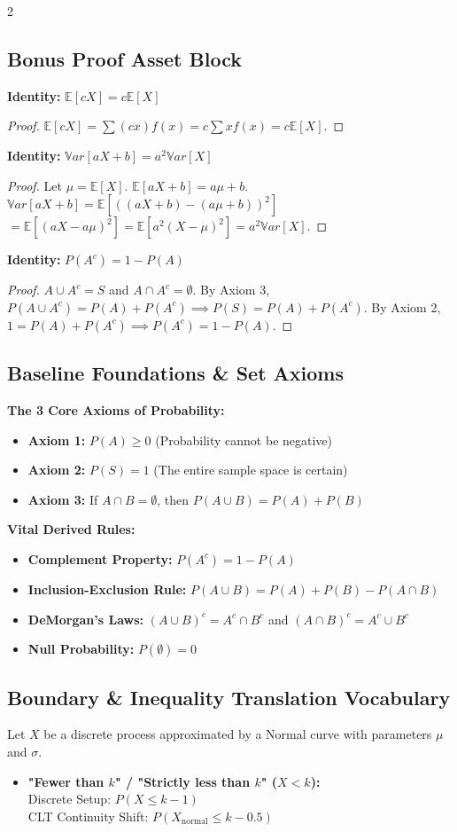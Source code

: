 \documentclass[9pt,landscape]{article}
\newcommand{\Var}{\mathbb{V}ar}
\newcommand{\E}{\mathbb{E}}
\begin{document}
\begin{multicols*}{2}
\subsection*{Bonus Proof Asset Block}
\textbf{Identity: } $\E[cX] = c\E[X]$
\begin{proof}
$\E[cX] = \sum (cx)f(x) = c\sum xf(x) = c\E[X].$
\end{proof}

\textbf{Identity: } $\Var[aX + b] = a^2\Var[X]$
\begin{proof}
Let $\mu = \E[X]$. $\E[aX+b] = a\mu+b$. \\
$\Var[aX+b] = \E[((aX+b) - (a\mu+b))^2]$ \\
$= \E[(aX - a\mu)^2] = \E[a^2(X-\mu)^2] = a^2\Var[X].$
\end{proof}

\textbf{Identity: } $P(A^c) = 1 - P(A)$
\begin{proof}
$A \cup A^c = S$ and $A \cap A^c = \emptyset$. By Axiom 3, $P(A \cup A^c) = P(A) + P(A^c) \implies P(S) = P(A) + P(A^c)$. By Axiom 2, $1 = P(A) + P(A^c) \implies P(A^c) = 1 - P(A).$
\end{proof}
\subsection*{Baseline Foundations \& Set Axioms}
\textbf{The 3 Core Axioms of Probability:}
\begin{itemize}
    \item \textbf{Axiom 1:} $P(A) \ge 0$ \quad (Probability cannot be negative)
    \item \textbf{Axiom 2:} $P(S) = 1$ \quad (The entire sample space is certain)
    \item \textbf{Axiom 3:} If $A \cap B = \emptyset$, then $P(A \cup B) = P(A) + P(B)$
\end{itemize}
\textbf{Vital Derived Rules:}
\begin{itemize}
    \item \textbf{Complement Property:} $P(A^c) = 1 - P(A)$
    \item \textbf{Inclusion-Exclusion Rule:} $P(A \cup B) = P(A) + P(B) - P(A \cap B)$
    \item \textbf{DeMorgan's Laws:} $(A \cup B)^c = A^c \cap B^c$ \quad and \quad $(A \cap B)^c = A^c \cup B^c$
    \item \textbf{Null Probability:} $P(\emptyset) = 0$
\end{itemize}
\subsection*{Boundary \& Inequality Translation Vocabulary}
Let $X$ be a discrete process approximated by a Normal curve with parameters $\mu$ and $\sigma$.
\begin{itemize}
    \item \textbf{"Fewer than $k$" / "Strictly less than $k$" ($X < k$):} \\
    Discrete Setup: $P(X \le k - 1)$ \\
    CLT Continuity Shift: $P(X_{\text{normal}} \le k - 0.5)$
    

\end{itemize}
\end{multicols*}
\end{document}
